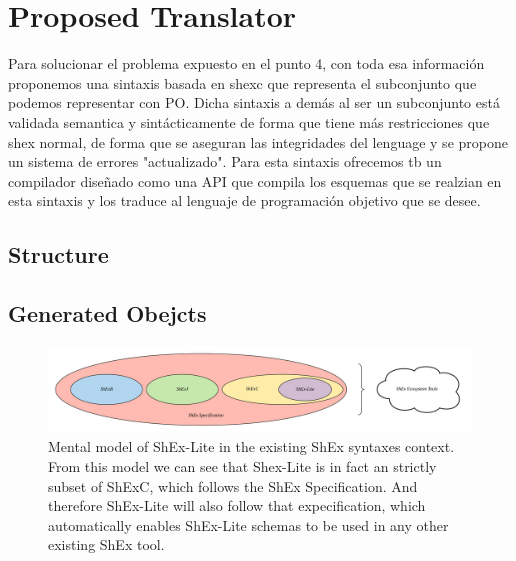 \chapter{Proposed Translator}
\label{ch:proposed-system}

Para solucionar el problema expuesto en el punto 4, con toda esa información
proponemos una sintaxis basada en shexc que representa el subconjunto que podemos representar con PO.
Dicha sintaxis a demás al ser un subconjunto está validada semantica y sintácticamente de forma que
tiene más restricciones que shex normal, de forma que se aseguran las integridades del lenguage y
se propone un sistema de errores "actualizado". Para esta sintaxis ofrecemos tb un compilador
diseñado como una API que compila los esquemas que se realzian en esta sintaxis y los traduce al
lenguaje de programación objetivo que se desee.

\section{Structure}

\section{Generated Obejcts}

\begin{figure}
    \includegraphics[width=\textwidth]{images/shex-lite-syntaxes-mental-model.png}
    \centering
    \caption[Mental model of ShEx-Lite in the existing ShEx syntaxes context.]{Mental model of
    ShEx-Lite in the existing ShEx syntaxes context. From this model we can see that Shex-Lite
    is in fact an strictly subset of ShExC, which follows the ShEx Specification. And therefore
    ShEx-Lite will also follow that expecification, which automatically enables ShEx-Lite schemas
    to be used in any other existing ShEx tool.}
    \label{fig:syntax-mental-model}
\end{figure}

